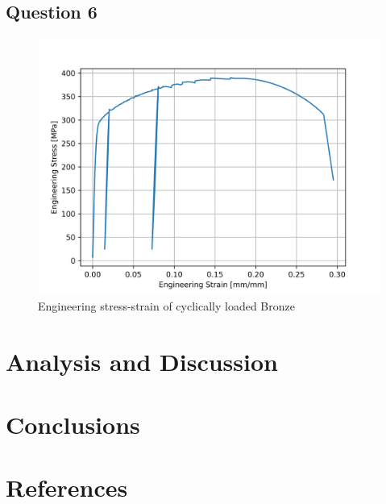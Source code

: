 \documentclass{article}
\begin{document}
\subsection{Question 6}
\begin{figure}[!h]
    \centering
    \includegraphics[width=0.5\linewidth]{plots/q6_br.png}
    \caption{Engineering stress-strain of cyclically loaded Bronze}
    \label{fig:br}
\end{figure}

\section{Analysis and Discussion}

\newpage
\section{Conclusions}
\newpage
\section{References}
\printbibliography[heading=none]
\end{document}
